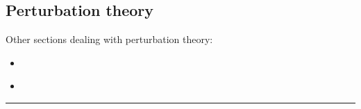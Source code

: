 \documentclass[letterpaper,10pt,english]{jupyterBook}
\begin{document}
\sphinxstepscope


\subsection{Perturbation theory}
\label{\detokenize{ch/quantum-mechanics/qft/interactions-perturbation:perturbation-theory}}\label{\detokenize{ch/quantum-mechanics/qft/interactions-perturbation:quantum-mechanics-qft-interactions-perturbation-theory}}\label{\detokenize{ch/quantum-mechanics/qft/interactions-perturbation::doc}}
\sphinxAtStartPar
Other sections dealing with perturbation theory:
\begin{itemize}
\item {} 
\sphinxAtStartPar
{\hyperref[\detokenize{ch/quantum-mechanics/history/heisenberg-reinterpretation:quantum-mechanics-history-heisenberg-reinterpretation-transition-perturbation-theory}]{}}

\item {} 
\sphinxAtStartPar
{\hyperref[\detokenize{ch/quantum-mechanics/einstein-coeffs-interaction-picture:quantum-mechanics-einstein-coeffs-interaction-picture-perturbation}]{}}

\end{itemize}

\sphinxAtStartPar
{} 


\bigskip\hrule\bigskip
\end{document}
